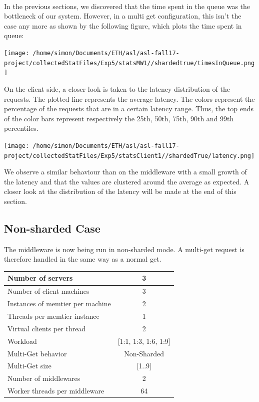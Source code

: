 \documentclass[11pt,a4paper]{article}
\begin{document}
\\
In the previous sections, we discovered that the time spent in the queue was the bottleneck of our system. However, in a multi get configuration, this isn't the case any more as shown by the following figure, which plots the time spent in queue:  
 \begin{center}
\texttt{[image: /home/simon/Documents/ETH/asl/asl-fall17-project/collectedStatFiles/Exp5/statsMW1//shardedtrue/timesInQueue.png]}
\end{center}


On the client side, a closer look is taken to the latency distribution of the requests. The plotted line represents the average latency. The colors represent the percentage of the requests that are in a certain latency range. Thus, the top ends of the color bars represent respectively the 25th, 50th, 75th, 90th and 99th percentiles. 
  
 \begin{center}
\texttt{[image: /home/simon/Documents/ETH/asl/asl-fall17-project/collectedStatFiles/Exp5/statsClient1//shardedTrue/latency.png]}
\end{center}

We observe a similar behaviour than on the middleware with a small growth of the latency and that the values are clustered around the average as expected. A closer look at the distribution of the latency will be made at the end of this section. 

\subsection{Non-sharded Case}

The middleware is now being run in non-sharded mode. A multi-get request is therefore handled in the same way as a normal get. 

\begin{center}
	\scriptsize{
		\begin{tabular}{|l|c|}
			\hline Number of servers                & 3                       \\ 
			\hline Number of client machines        & 3                       \\ 
			\hline Instances of memtier per machine & 2                       \\ 
			\hline Threads per memtier instance     & 1                       \\
			\hline Virtual clients per thread       & 2                		 \\ 
			\hline Workload                         & [1:1, 1:3, 1:6, 1:9]             \\
			\hline Multi-Get behavior               & Non-Sharded             \\
			\hline Multi-Get size                   & [1..9]                  \\
			\hline Number of middlewares            & 2                       \\
			\hline Worker threads per middleware    & 64 \\
			\hline 
		\end{tabular}
	} 
\end{center}
\end{document}
